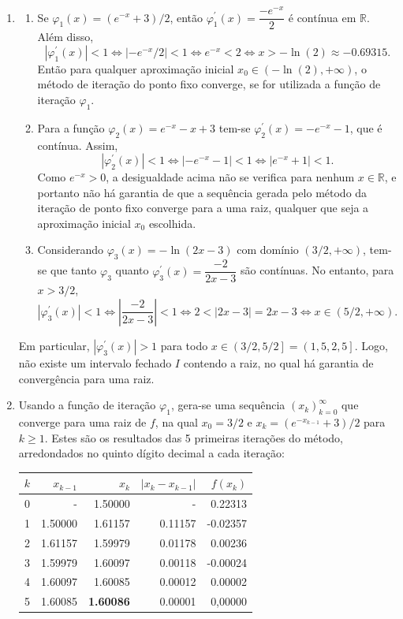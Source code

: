 \documentclass[12pt,a4paper]{article}
\newcommand*\R{\mathbb{R}}
\begin{document}
\begin{ExerciseList}
\begin{enumerate}
\item 
\begin{enumerate}
\item Se $\varphi_1(x) = (e^{-x}+3)/2$, então $\varphi_1^\prime(x) = \dfrac{-e^{-x}}{2}$ é contínua em $\R$. Além disso,
\[
| \varphi_1^\prime(x) | < 1
\Leftrightarrow
\left| -e^{-x}/2 \right| < 1
\Leftrightarrow
e^{-x} < 2
\Leftrightarrow
x > -\ln(2) \approx -0.69315.
\]
Então para qualquer aproximação inicial $x_0 \in (-\ln(2), +\infty)$, o método de iteração do ponto fixo converge, se for utilizada a função de iteração $\varphi_1$.
\item Para a função $\varphi_2(x) = e^{-x}-x+3$ tem-se $\varphi_2^\prime(x) = -e^{-x}-1$, que é contínua. Assim,
\[
| \varphi_2^\prime(x) | < 1
\Leftrightarrow
\left| -e^{-x}-1 \right| < 1
\Leftrightarrow
\left| e^{-x} + 1 \right| < 1.
\]
Como $e^{-x} > 0$, a desigualdade acima não se verifica para nenhum $x \in \R$, e portanto não há garantia de que a sequência gerada pelo método da iteração de ponto fixo converge para a uma raiz, qualquer que seja a aproximação inicial $x_0$ escolhida.
\item Considerando $\varphi_3(x) = -\ln{(2x-3)}$ com domínio $(3/2, +\infty)$, tem-se que tanto $\varphi_3$ quanto $\varphi_3^\prime(x) = \dfrac{-2}{2x-3}$ são contínuas. No entanto, para $x > 3/2$,
\[
| \varphi_3^\prime(x) | < 1
\Leftrightarrow
\left| \dfrac{-2}{2x-3} \right| < 1
\Leftrightarrow
2 < |2x-3| = 2x-3
\Leftrightarrow
x \in \left(5/2, +\infty \right).
\]
\end{enumerate}
Em particular, $|\varphi_3^\prime(x)| > 1$ para todo $x \in \left(3/2, 5/2 \right] = \left(1,5, 2,5 \right]$. Logo, não existe um intervalo fechado $I$ contendo a raiz, no qual há garantia de convergência para uma raiz.

\item Usando a função de iteração $\varphi_1$, gera-se uma sequência $(x_k)_{k=0}^\infty$ que converge para uma raiz de $f$, na qual $x_0 = 3/2$ e $x_k = (e^{-x_{k-1}}+3)/2$ para $k \geq 1$. Estes são os resultados das 5 primeiras iterações do método, arredondados no quinto dígito decimal a cada iteração:
\begin{center}
\begin{tabular}{|r|r|r|r|r|}
\hline
$k$ &  $x_{k-1}$ &  $x_k$ & $|x_k - x_{k-1}|$ & $f(x_k)$ \\
\hline
0 &       - & 1.50000 &      -  &  0.22313 \\
\hline
1 & 1.50000 & 1.61157 & 0.11157 & -0.02357 \\
\hline
2 & 1.61157 & 1.59979 & 0.01178 &  0.00236 \\
\hline
3 & 1.59979 & 1.60097 & 0.00118 & -0.00024 \\
\hline
4 & 1.60097 & 1.60085 & 0.00012 &  0.00002 \\
\hline
5 & 1.60085 & \textbf{1.60086} & 0.00001 &  0,00000 \\
\hline
\end{tabular}
\end{center}


\end{enumerate}
\end{ExerciseList}
\end{document}
